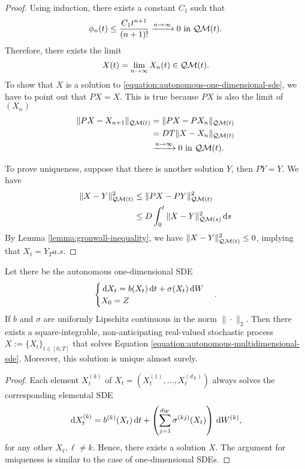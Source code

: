 \begin{proof}
  Using induction, there exists a constant $C_1$ such that
  $$  \phi_n(t) \le \dfrac{C_1t^{n+1}}{(n+1)!}\xrightarrow{n\to\infty}0 \text{ in } \mathcal{Q}\mathcal{M}(t).$$
  Therefore, there exists the limit
  $$X(t)=\lim\limits_{n\to\infty}X_n(t)\in\mathcal{Q}\mathcal{M}(t).$$
  To show that $X$ is a solution to \ref{equation:autonomous-one-dimensional-sde}, we have to point out that $PX=X$. This is true because $PX$ is also the limit of $(X_n)$
  \begin{align*}
    \|PX-X_{n+1}\|_{\mathcal{Q}\mathcal{M}(t)}
     & =  \|PX-PX_{n}\|_{\mathcal{Q}\mathcal{M}(t)}                      \\
     & = DT \|X-X_n\|_{\mathcal{Q}\mathcal{M}(t)}                        \\
     & \xrightarrow{n\to\infty} 0 \text{ in } \mathcal{Q}\mathcal{M}(t).
  \end{align*}

  To prove uniqueness, suppose that there is another solution $Y$, then $PY=Y$. We have
  \begin{align*}
    \|X-Y\|_{\mathcal{Q}\mathcal{M}(t)}^2
     & \le \|PX-PY\|_{\mathcal{Q}\mathcal{M}(t)}^2            \\
     & \le D\int_0^t\|X-Y\|_{\mathcal{Q}\mathcal{M}(s)}^2\,\mathrm{d} s \\
  \end{align*}
  By Lemma \ref{lemma:gronwall-inequality}, we have $\|X-Y\|_{\mathcal{Q}\mathcal{M}(t)}^2\le0$, implying that $X_t = Y_T a.s.$
\end{proof}

\begin{theorem}
  \label{theorem:existence-and-uniqueness-solution-to-sdes-in-multidimension}
  Let there be the autonomous one-dimensional SDE \label{equation:autonomous-multidimensional-sde}
  $$\begin{cases}
      \,\mathrm{d} X_t = b(X_t)\,\mathrm{d} t+\sigma(X_t)\,\mathrm{d} W \\
      X_{0} = Z
    \end{cases}.$$
  If $b$ and $\sigma$ are uniformly Lipschitz continuous in the norm $\|\cdot\|_2$. Then there exists a square-integrable, non-anticipating real-valued stochastic process $X := \{X_t\}_{t\in[0,T]}$ that solves Equation \ref{equation:autonomous-multidimensional-sde}. Moreover, this solution is unique almost surely.
\end{theorem}

\begin{proof}
  Each element $X_t^{(k)}$ of $X_t=\left(X_t^{(1)}, \ldots, X_t^{(d_X)}\right)$ always solves the corresponding elemental SDE
  \begin{align*}
    \,\mathrm{d} X_t^{(k)} = b^{(k)}(X_t)\,\mathrm{d} t + \left(\sum\limits_{j=1}^{d_W} \sigma^{(kj)}(X_t)\right)\,\mathrm{d} W^{(k)},
  \end{align*}
  for any other $X_\ell, \ell\ne k$. Hence, there exists a solution $X$. The argument for uniqueness is similar to the case of one-dimensional SDEs.
\end{proof}

